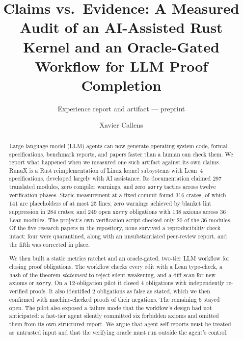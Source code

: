 \documentclass[sigconf,nonacm]{acmart}
\begin{document}
\title{Claims vs.\ Evidence: A Measured Audit of an AI-Assisted Rust Kernel and an Oracle-Gated Workflow for LLM Proof Completion}
\subtitle{Experience report and artifact --- preprint}

\author{Xavier Callens}

\begin{abstract}
Large language model (LLM) agents can now generate operating-system code, formal specifications, benchmark reports, and papers faster than a human can check them. We report what happened when we measured one such artifact against its own claims. RunuX is a Rust reimplementation of Linux kernel subsystems with Lean~4 specifications, developed largely with AI assistance. Its documentation claimed 297 translated modules, zero compiler warnings, and zero \texttt{sorry} tactics across twelve verification phases. Static measurement at a fixed commit found 316 crates, of which 141 are placeholders of at most 25 lines; zero warnings achieved by blanket lint suppression in 284 crates; and 249 open \texttt{sorry} obligations with 138 axioms across 36 Lean modules. The project's own verification script checked only 20 of the 36 modules. Of the five research papers in the repository, none survived a reproducibility check intact: four were quarantined, along with an unsubstantiated peer-review report, and the fifth was corrected in place.

We then built a static metrics ratchet and an oracle-gated, two-tier LLM workflow for closing proof obligations. The workflow checks every edit with a Lean type-check, a hash of the theorem \emph{statement} to reject silent weakening, and a diff scan for new axioms or \texttt{sorry}. On a 12-obligation pilot it closed 4 obligations with independently re-verified proofs. It also identified 2 obligations as false as stated, which we then confirmed with machine-checked proofs of their negations. The remaining 6 stayed open. The pilot also exposed a failure mode that the workflow's design had not anticipated: a fast-tier agent silently committed six forbidden axioms and omitted them from its own structured report. We argue that agent self-reports must be treated as untrusted input and that the verifying oracle must run outside the agent's control.
\end{abstract}

\end{document}
